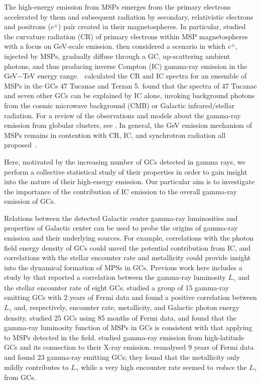 \documentclass[doublespace,nopageskip]{VTthesis} %
\begin{document}
The high-energy emission from MSPs emerges from the primary electrons accelerated by them and  subsequent radiation by secondary, relativistic electrons and positrons ($e^\pm$) pair created in their magnetospheres. In particular, \citet{2005ApJ...622..531H} studied the curvature radiation (CR) of primary electrons within MSP magnetospheres with a focus on GeV-scale emission. \citet{2007MNRAS.377..920B} then considered a scenario in which $e^\pm$, injected by MSPs, gradually diffuse through a GC, up-scattering ambient photons, and thus producing inverse Compton (IC) gamma-ray emission in the GeV$-$TeV energy range.~\citet{2009ApJ...696L..52V} calculated the CR and IC spectra for an ensemble of MSPs in the GCs 47 Tucanae and Terzan 5. \citet{2010ApJ...723.1219C} found that the spectra of 47 Tucanae and seven other GCs can be explained by IC alone, invoking background photons from the cosmic microwave background (CMB) or Galactic infrared/stellar radiation. {For a review of the observations and models about the gamma-ray emission from globular clusters, see \citet{2016JASS...33....1T}.} In general, the GeV emission mechanism of MSPs remains in contention with CR, IC, and synchrotron radiation all  proposed~\citep{2021arXiv210105751H}.

Here, motivated by the increasing number of GCs detected in gamma rays, we perform a collective statistical study of their properties in order to gain insight into the nature of their high-energy emission. Our particular aim is to investigate the importance of the contribution of IC emission to the overall gamma-ray emission of GCs.

Relations between the detected Galactic center gamma-ray luminosities and properties of Galactic center can be used to probe the origins of gamma-ray emission and their underlying sources. For example, correlations with the photon field energy density of GCs could unveil the potential contribution from IC, and correlations with the stellar encounter rate and metallicity could provide insight into the dynamical formation of MPSs in GCs. Previous work here includes a study by \citet{2010A&A...524A..75A} that reported a correlation between the gamma-ray luminosity $L_\gamma$ and the stellar encounter rate of eight GCs. \citet{2011ApJ...726..100H} studied a group of 15 gamma-ray emitting GCs with 2 years of Fermi data and found a positive correlation between $L_\gamma$ and, respectively, encounter rate, metallicity, and Galactic photon energy density. \citet{2016JCAP...08..018H} studied 25 GCs using 85 months of Fermi data, and found that the gamma-ray luminosity function of MSPs in GCs is consistent with that applying to MSPs detected in the field. \citet{2018MNRAS.480.4782L} studied gamma-ray emission from high-latitude GCs and its connection to their X-ray emission. \citet{2019MNRAS.486..851D} reanalysed 9 years of Fermi data and found 23 gamma-ray emitting GCs; they found that the metallicity only mildly contributes to $L_\gamma$ while a very high encounter rate seemed to {\it reduce} the $L_\gamma$ from GCs.
\end{document}
